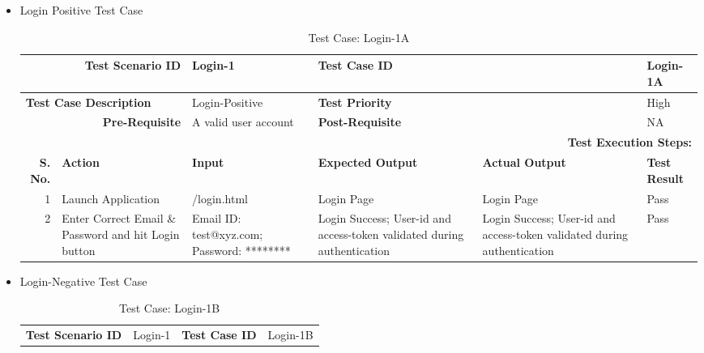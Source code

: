 \documentclass[a4paper, hidelinks, 12pt]{report}
\begin{document}
\begin{itemize}
\item{Login Positive Test Case}
\begin{table}[H]
  \centering
  \caption{Test Case: Login-1A}
    \begin{tabular}{|r|p{4.355em}|p{7.715em}|p{6.43em}|p{5.855em}|p{5.07em}|}
    \toprule
    \multicolumn{2}{|p{13.425em}|}{\textbf{Test Scenario ID}} & Login-1 & \multicolumn{2}{p{12.285em}|}{\textbf{Test Case ID}} & Login-1A \\
    \midrule
    \multicolumn{2}{|l|}{\multirow{2}[2]{*}{\textbf{Test Case Description}}} & \multirow{2}[2]{*}{Login-Positive} & \multicolumn{2}{l|}{\multirow{2}[2]{*}{\textbf{Test Priority}}} & \multirow{2}[2]{*}{High} \\
    \multicolumn{2}{|l|}{} & \multicolumn{1}{l|}{} & \multicolumn{2}{l|}{} & \multicolumn{1}{l|}{} \\
    \midrule
    \multicolumn{2}{|p{13.425em}|}{\textbf{Pre-Requisite}} & A valid user account & \multicolumn{2}{p{12.285em}|}{\textbf{Post-Requisite}} & NA \\
    \midrule
    \multicolumn{6}{p{38.495em}|}{\textbf{Test Execution Steps:}} \\
    \midrule
    \multicolumn{1}{|p{5.07em}|}{\textbf{S. No.}} & \textbf{Action } & \textbf{Input} & \textbf{Expected Output} & \textbf{Actual Output} & \textbf{Test Result} \\
    \midrule
    1     & Launch Application & /login.html & Login Page & Login Page & Pass \\
    \midrule
    2     & Enter Correct Email \& Password and hit Login button & Email ID: test@xyz.com; Password: ******** & Login Success; User-id and access-token validated during authentication & Login Success; User-id and access-token validated during authentication & Pass \\
    \bottomrule
    \end{tabular}%
  \label{tab:Text case: Login-1A}%
\end{table}%
\item{Login-Negative Test Case}
\begin{table}[H]
  \centering
  \caption{Test Case: Login-1B}
    \begin{tabular}{|r|p{4.355em}|p{7.715em}|p{6.43em}|p{5.855em}|p{5.07em}|}
    \toprule
    \multicolumn{2}{|p{13.425em}|}{\textbf{Test Scenario ID}} & Login-1 & \multicolumn{2}{p{12.285em}|}{\textbf{Test Case ID}} & Login-1B \\

\end{tabular}
\end{table}
\end{itemize}
\end{document}
